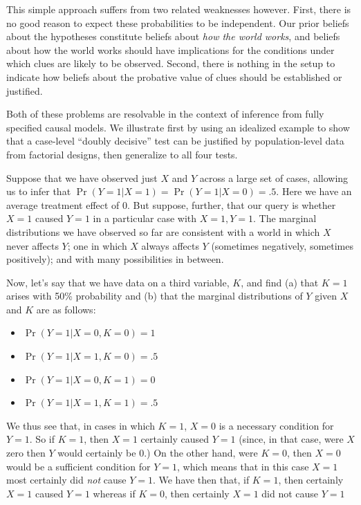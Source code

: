 \documentclass[
  12pt,
]{book}
\providecommand{\tightlist}{%
  \setlength{\itemsep}{0pt}\setlength{\parskip}{0pt}}
\begin{document}
This simple approach suffers from two related weaknesses however. First, there is no good reason to expect these probabilities to be independent. Our prior beliefs about the hypotheses constitute beliefs about \emph{how the world works}, and beliefs about how the world works should have implications for the conditions under which clues are likely to be observed. Second, there is nothing in the setup to indicate how beliefs about the probative value of clues should be established or justified.

Both of these problems are resolvable in the context of inference from fully specified causal models. We illustrate first by using an idealized example to show that a case-level ``doubly decisive'' test can be justified by population-level data from factorial designs, then generalize to all four tests.

Suppose that we have observed just \(X\) and \(Y\) across a large set of cases, allowing us to infer that \(\Pr(Y=1|X=1) = \Pr(Y=1|X=0) = .5\). Here we have an average treatment effect of 0. But suppose, further, that our query is whether \(X=1\) caused \(Y=1\) in a particular case with \(X=1, Y=1\). The marginal distributions we have observed so far are consistent with a world in which \(X\) never affects \(Y\); one in which \(X\) always affects \(Y\) (sometimes negatively, sometimes positively); and with many possibilities in between.

Now, let's say that we have data on a third variable, \(K\), and find (a) that \(K=1\) arises with 50\% probability and (b) that the marginal distributions of \(Y\) given \(X\) and \(K\) are as follows:

\begin{itemize}
\tightlist
\item
  \(\Pr(Y=1|X=0, K = 0) = 1\)
\item
  \(\Pr(Y=1|X=1, K = 0) = .5\)
\item
  \(\Pr(Y=1|X=0, K = 1) = 0\)
\item
  \(\Pr(Y=1|X=1, K = 1) = .5\)
\end{itemize}

We thus see that, in cases in which \(K=1\), \(X=0\) is a necessary condition for \(Y=1\). So if \(K=1\), then \(X=1\) certainly caused \(Y=1\) (since, in that case, were \(X\) zero then \(Y\) would certainly be 0.) On the other hand, were \(K=0\), then \(X=0\) would be a sufficient condition for \(Y=1\), which means that in this case \(X=1\) most certainly did \emph{not} cause \(Y=1\). We have then that, if \(K=1\), then certainly \(X=1\) caused \(Y=1\) whereas if \(K=0\), then certainly \(X=1\) did not cause \(Y=1\)
\end{document}
